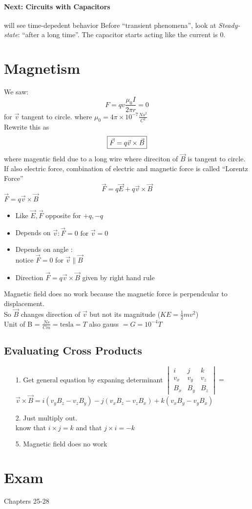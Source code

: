 \documentclass{article}
\begin{document}
    \paragraph{Next: Circuits with Capacitors} will see time-depedent behavior
    Before ``transient phenomena'', look at \textit{Steady-state}: ``after a long time''. The capacitor starts acting like the current is 0.

    \section{Magnetism}
    We saw: $$F = qv\frac{\mu_0 I}{2\pi r} = 0$$
    for $\vec{v}$ tangent to circle.
    where $\mu_0 = 4\pi \times 10^{-7} \frac{Ns^2}{C^2}$\\
    Rewrite this as $$\boxed{$$\vec{F} = q\vec{v}\times \vec{B}$$}$$
    where  magentic field due to a long wire where direciton of $\vec{B}$ is tangent to circle.
    \\If also electric force, combination of electric and magnetic force is called ``Lorentz Force'' $$\vec{F} = q\vec{E} + q\vec{v}\times \vec{B}$$
    $\vec{F} = q\vec{v}\times \vec{B}$
    \begin{itemize}
        \item Like $\vec{E}, \vec{F}$ opposite for $+q, -q$
        \item Depends on $\vec{v}: \vec{F} = 0 \text{ for } \vec{v} = 0$
        \item Depends on angle : \\
        notice $\vec{F} = 0$ for $\vec{v} \parallel \vec{B}$
        \item Direction $\vec{F} = q\vec{v}\times\vec{B}$ given by right hand rule
    \end{itemize}
    Magnetic field does no work because the magnetic force is perpendcular to displacement.\\
    So $\vec{B}$ changes direction of $\vec{v}$ but not its magnitude ($KE = \frac{1}{2}mv^2$)\\
    Unit of B = $\frac{Ns}{Cm} = \text{tesla} = T$ also gauss $= G = 10^{-4} T$
    \subsection{Evaluating Cross Products}
    \begin{itemize}
        \item [1.] Get general equation by expaning determinant 
        $\begin{vmatrix} i & j & k \\ v_x & v_y & v_z \\ B_x & B_y & B_z\end{vmatrix} = $\\
            $\vec{v}\times \vec{B} = i(v_yB_z-v_zB_y) - j(v_xB_z - v_zB_x) + k(v_xB_y-v_yB_x)$
        \item [2.] Just multiply out.\\
        know that $i \times j = k$ and that $j \times i = -k$
        \item [5.] Magnetic field does no work
    \end{itemize}

    \section{Exam}
    Chapters 25-28
\end{document}
